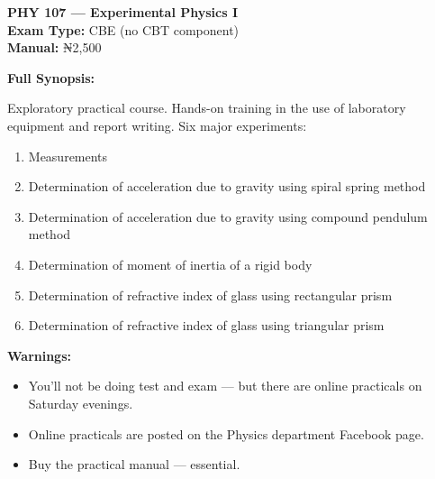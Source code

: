 \documentclass[11pt,a4paper]{article}
\begin{document}
\begin{coursebox}
    \textbf{\color{primary}\Large PHY 107 --- Experimental Physics I}\\[0.3em]
    \textbf{Exam Type:} CBE (no CBT component) \\
    \textbf{Manual:} ₦2,500

    \vspace{0.8em}

    \textbf{Full Synopsis:}

    Exploratory practical course. Hands-on training in the use of laboratory equipment and report writing. Six major experiments:
    \begin{enumerate}[leftmargin=1.5em, itemsep=0.2em]
        \item Measurements
        \item Determination of acceleration due to gravity using spiral spring method
        \item Determination of acceleration due to gravity using compound pendulum method
        \item Determination of moment of inertia of a rigid body
        \item Determination of refractive index of glass using rectangular prism
        \item Determination of refractive index of glass using triangular prism
    \end{enumerate}

    \vspace{0.8em}

    \textbf{\color{warningText}Warnings:}
    \begin{itemize}[leftmargin=1.5em, itemsep=0.2em]
        \item You'll not be doing test and exam --- but there are online practicals on Saturday evenings.
        \item Online practicals are posted on the Physics department Facebook page.
        \item Buy the practical manual --- essential.
    \end{itemize}
\end{coursebox}
\end{document}

